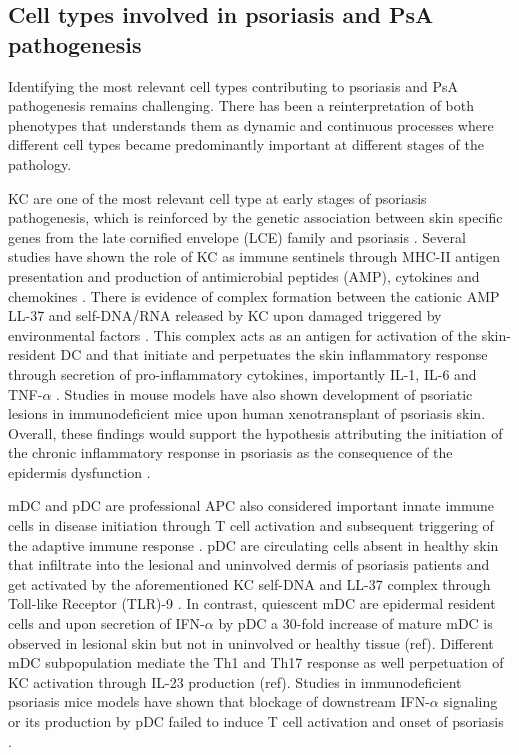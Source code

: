 \subsection{Cell types involved in psoriasis and PsA pathogenesis}

Identifying the most relevant cell types contributing to psoriasis and PsA pathogenesis remains challenging. There has been a reinterpretation of both phenotypes that understands them as dynamic and continuous processes where different cell types became predominantly important at different stages of the pathology. 

KC are one of the most relevant cell type at early stages of psoriasis pathogenesis, which is reinforced by the genetic association between skin specific genes from the late cornified envelope (LCE) family and psoriasis \parencite{Tsoi2012}. Several studies have shown the role of KC as immune sentinels through MHC-II antigen presentation and production of antimicrobial peptides (AMP), cytokines and chemokines \parencite{Black2007}. There is evidence of complex formation between the cationic AMP LL-37 and self-DNA/RNA released by KC upon damaged triggered by environmental factors \parencite{Lande2007}. This complex acts as an antigen for activation of the skin-resident DC \parencite{Nestle2005} and that initiate and perpetuates the skin inflammatory response through secretion of pro-inflammatory cytokines, importantly IL-1, IL-6 and TNF-$\alpha$ \parencite{Feldmeyer2007, Arend2008, Nestle2009}. Studies in mouse models have also shown development of psoriatic lesions in immunodeficient mice upon human xenotransplant of psoriasis skin\parencite{Boyman2004}. Overall, these findings would support the hypothesis attributing the initiation of the chronic inflammatory response in psoriasis as the consequence of the epidermis dysfunction . 

mDC and pDC are professional APC also considered important innate immune cells in disease initiation through T cell activation and subsequent triggering of the adaptive immune response \parencite{Mahil2016}. %
pDC are circulating cells absent in healthy skin that infiltrate into the lesional and uninvolved dermis of psoriasis patients and get activated by the aforementioned KC self-DNA and LL-37 complex through Toll-like Receptor (TLR)-9 \parencite{Nestle2005, Lande2007}. In contrast, quiescent mDC are epidermal resident cells and upon secretion of IFN-$\alpha$ by pDC a 30-fold increase of mature mDC is observed in lesional skin but not in uninvolved or healthy tissue (ref). Different mDC subpopulation mediate the Th1 and Th17 response as well perpetuation of KC activation through IL-23 production (ref). Studies in immunodeficient psoriasis mice models have shown that blockage of downstream  IFN-$\alpha$ signaling or its production by pDC failed to induce T cell activation and onset of psoriasis \parencite{Nestle2005}. 

